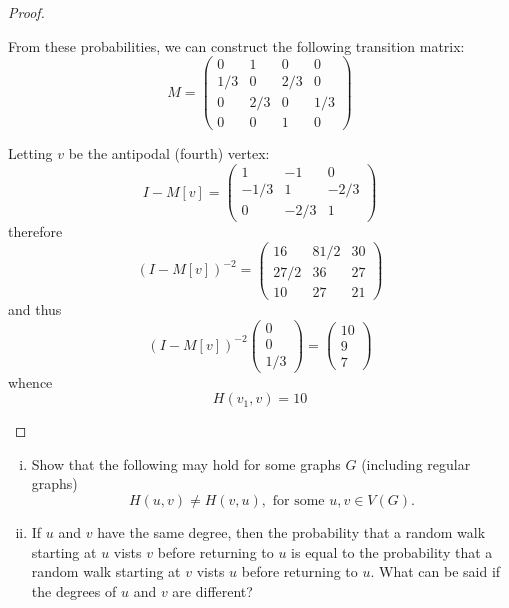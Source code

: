 \documentclass[11pt]{scrartcl}
\begin{document}
\begin{proof}
\begin{enumerate}[(i)]
        From these probabilities, we can construct the following transition matrix:
        \[
            M = \begin{pmatrix}
                0 & 1 & 0 & 0\\
                1/3 & 0 & 2/3 & 0\\
                0 & 2/3 & 0 & 1/3\\
                0 & 0 & 1 & 0
            \end{pmatrix}
        \]

        Letting $v$ be the antipodal (fourth) vertex:
        \[
            I - M[v] = \begin{pmatrix}
                1 & -1 & 0\\
                -1/3 & 1 & -2/3\\
                0 & -2/3 & 1
            \end{pmatrix}
        \]
        therefore
        \[
            (I - M[v])^{-2} = \begin{pmatrix}
                16 & 81/2 & 30\\
                27/2 & 36 & 27\\
                10 & 27 & 21
            \end{pmatrix}
        \]
        and thus
        \[
            (I - M[v])^{-2} \begin{pmatrix}
                0\\
                0\\
                1/3
            \end{pmatrix} = \begin{pmatrix}
                10\\
                9\\
                7
            \end{pmatrix}
        \]
        whence
        \[
            H(v_1, v) = 10    
        \]

    \end{enumerate}
\end{proof}
\begin{problem}
    \begin{enumerate}[(i)]
        \item Show that the following may hold for some graphs $G$ (including regular graphs)
        \[H(u,v)\neq H(v,u),\text{ for some }u,v\in V(G).\]
        \item If $u$ and $v$ have the same degree, then the probability that a random walk starting at $u$ vists $v$ before returning to $u$ is equal to the probability that a random walk starting at $v$ vists $u$ before returning to $u$. What can be said if the degrees of $u$ and $v$ are different?
    \end{enumerate}
\end{problem}
\end{document}
